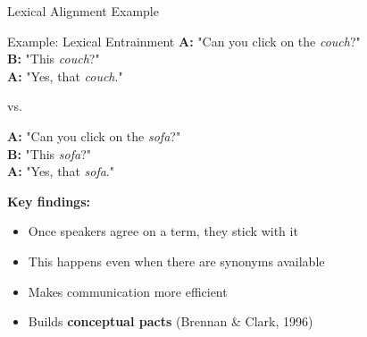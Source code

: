 \documentclass[aspectratio=169]{beamer}
\begin{document}
\begin{frame}{Lexical Alignment Example 📝}
\small
    \begin{block}{Example: Lexical Entrainment}
        \textbf{A:} "Can you click on the \textit{couch}?" \\
        \textbf{B:} "This \textit{couch}?" \\
        \textbf{A:} "Yes, that \textit{couch}." \\

        \vspace{0.3cm}

        vs. \\

        \vspace{0.3cm}

        \textbf{A:} "Can you click on the \textit{sofa}?" \\
        \textbf{B:} "This \textit{sofa}?" \\
        \textbf{A:} "Yes, that \textit{sofa}."
    \end{block}

    \vspace{0.3cm}

    \textbf{Key findings:}
    \begin{itemize}\setlength{\itemsep}{0pt}
        \item Once speakers agree on a term, they stick with it
        \item This happens even when there are synonyms available
        \item Makes communication more efficient
        \item Builds \textbf{conceptual pacts} (Brennan \& Clark, 1996)
    \end{itemize}
\end{frame}
\end{document}
